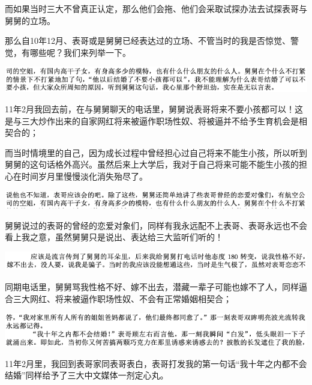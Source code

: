 \documentclass[9pt, b5paper]{article}
\begin{document}
而如果当时三大不曾真正认定，那么他们会拖、他们会采取试探办法去试探表哥与舅舅的立场。

那么自10年12月、表哥或是舅舅已经表达过的立场、不管当时的我是否惊觉、警觉，有哪些呢？我们来列举一下。  

\begin{center}
\includegraphics[width=.9\linewidth]{./pic/backups_plans_20210412_170813.png}
\end{center}

11年2月我回去前，在与舅舅聊天的电话里，舅舅说表哥将来不要小孩都可以！这是与三大炒作出来的自家网红将来被逼作职场性奴、将被逼并不给予生育机会是相契合的；

而当时情境里的自己，因为成长过程中曾经担心过自己将来不能生小孩，所以听到舅舅的这句话格外高兴。虽然后来上大学后，我对于自己将来可能不能生小孩的担心在时间岁月里慢慢淡化消失殆尽了。 

\begin{center}
\includegraphics[width=.9\linewidth]{./pic/backups_plans_20210412_171125.png}
\end{center}

舅舅说过的表哥的曾经的恋爱对象们，同样有我永远配不上表哥、表哥永远也不会看上我之意，虽然舅舅只是说出、表达给三大监听们听的！

\begin{center}
\includegraphics[width=.9\linewidth]{./pic/backups_plans_20210412_171215.png}
\end{center}

同期电话里，舅舅骂我性格不好、嫁不出去，潜藏一辈子可能也嫁不了人，同样逼合三大网红、将来被逼作职场性奴、不会有正常婚姻相契合；

\begin{center}
\includegraphics[width=.9\linewidth]{./pic/backups_plans_20210412_171242.png}
\end{center}

11年2月里，我回到表哥家同表哥表白，表哥打发我的第一句话“我十年之内都不会结婚”同样给予了三大中文媒体一剂定心丸。
\end{document}
